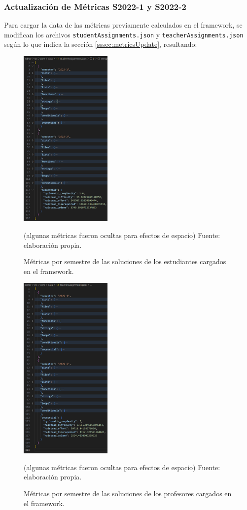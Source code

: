 \documentclass[letterpaper,12pt]{article}
\begin{document}
\subsubsection{Actualización de Métricas S2022-1 y S2022-2}
Para cargar la data de las métricas previamente calculados en el framework, se modifican los archivos \texttt{studentAssignments.json} y \texttt{teacherAssignments.json} según lo que indica la sección \ref{sssec:metricsUpdate}, resultando:
\begin{figure}[H]
  \centering
  \includegraphics[width=0.4\textwidth]{figures/studentsMetrics1.png}
  \caption{Métricas por semestre de las soluciones de los estudiantes cargados en el framework.} (algunas métricas fueron ocultas para efectos de espacio) Fuente: elaboración propia.
  \label{img:studentsMetrics1}
\end{figure}
\begin{figure}[H]
  \centering
  \includegraphics[width=0.4\textwidth]{figures/teacherMetrics1.png}
  \caption{Métricas por semestre de las soluciones de los profesores cargados en el framework.} (algunas métricas fueron ocultas para efectos de espacio) Fuente: elaboración propia.
  \label{img:teacherMetrics1}
\end{figure}
\end{document}
